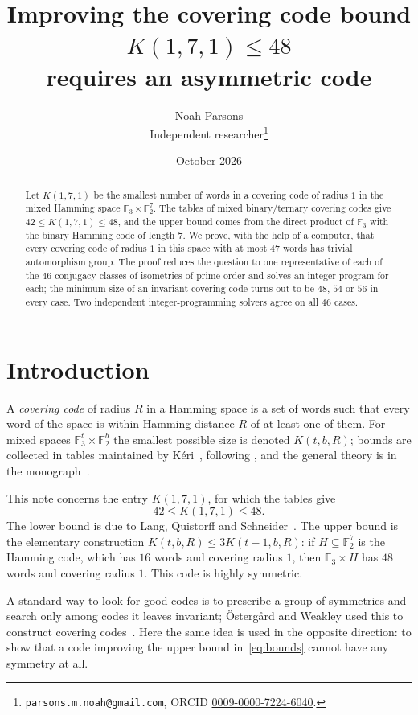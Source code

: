 \documentclass[11pt]{article}
\title{Improving the covering code bound $K(1,7,1)\le 48$\\ requires an asymmetric code}
\author{Noah Parsons\\ \small Independent researcher\thanks{%
\texttt{parsons.m.noah@gmail.com}, ORCID \href{https://orcid.org/0009-0000-7224-6040}{0009-0000-7224-6040}.}}
\date{October 2026}
\theoremstyle{definition}
\theoremstyle{remark}
\newcommand{\F}{\mathbb{F}}
\begin{document}
\maketitle

\begin{abstract}
Let $K(1,7,1)$ be the smallest number of words in a covering code of radius $1$ in the mixed
Hamming space $\F_3\times\F_2^7$. The tables of mixed binary/ternary covering codes give
$42\le K(1,7,1)\le 48$, and the upper bound comes from the direct product of $\F_3$ with the
binary Hamming code of length $7$. We prove, with the help of a computer, that every covering
code of radius $1$ in this space with at most $47$ words has trivial automorphism group.
The proof reduces the question to one representative of each of the $46$ conjugacy classes of
isometries of prime order and solves an integer program for each; the minimum size of an
invariant covering code turns out to be $48$, $54$ or $56$ in every case. Two independent
integer-programming solvers agree on all $46$ cases.
\end{abstract}

\section{Introduction}

A \emph{covering code} of radius $R$ in a Hamming space is a set of words such that every word
of the space is within Hamming distance $R$ of at least one of them. For mixed spaces
$\F_3^t\times\F_2^b$ the smallest possible size is denoted $K(t,b,R)$; bounds are collected in
tables maintained by K\'eri~\cite{keri}, following
\cite{ostergard-hamalainen-1997,bertolo-ostergard-weakley-2004}, and the general theory is in the
monograph~\cite{cohen-book}.

This note concerns the entry $K(1,7,1)$, for which the tables give
\begin{equation}\label{eq:bounds}
42 \le K(1,7,1) \le 48 .
\end{equation}
The lower bound is due to Lang, Quistorff and Schneider~\cite{lqs-2007}. The upper bound is the
elementary construction $K(t,b,R)\le 3K(t-1,b,R)$: if $H\subseteq\F_2^7$ is the Hamming code,
which has $16$ words and covering radius $1$, then $\F_3\times H$ has $48$ words and covering
radius $1$. This code is highly symmetric.

A standard way to look for good codes is to prescribe a group of symmetries and search only
among codes it leaves invariant; Östergård and Weakley used this to construct covering
codes~\cite{ostergard-weakley-1999}. Here the same idea is used in the opposite direction: to
show that a code improving the upper bound in~\eqref{eq:bounds} cannot have any symmetry at all.
\end{document}

